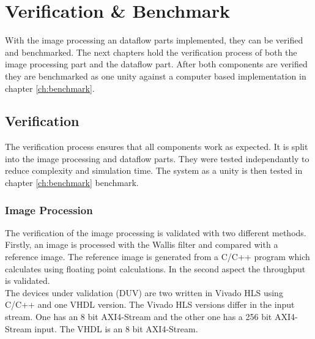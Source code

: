 %
%
\chapter{Verification \& Benchmark} \label{chapt:ver_bench}
With the image processing an dataflow parts implemented, they can be verified
and benchmarked. The next chapters hold the verification process of both the
image processing part and the dataflow part. After both components are verified
they are benchmarked as one unity against a computer based implementation in
chapter \ref{ch:benchmark}.


%
%
\section{Verification} \label{ch:verification}
The verification process ensures that all components work as expected. It is
split into the image processing and dataflow parts. They were tested
independantly to reduce complexity and simulation time. The system as a unity is
then tested in chapter \ref{ch:benchmark} benchmark.

%
%
\subsection{Image Procession}\label{ch:verification:imageprocessing}
The verification of the image processing is validated with two different 
methods. Firstly, an image is processed with the Wallis filter and compared 
with a reference image. The reference image is generated from a C/C++ program 
which calculates using floating point calculations. In the second aspect the 
throughput is validated. \\
The devices under validation (DUV) are two written in Vivado HLS using C/C++ 
and one VHDL version. The Vivado HLS versions differ in the input stream. One 
has an 8 bit AXI4-Stream and the other one has a 256 bit AXI4-Stream input. The
VHDL is an 8 bit AXI4-Stream.

